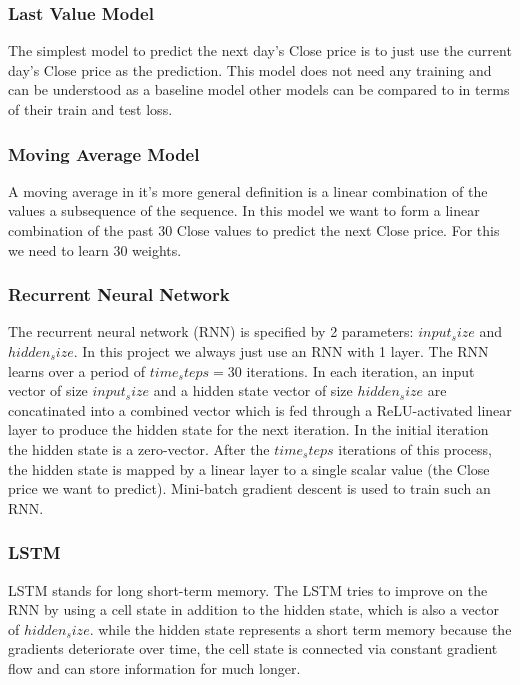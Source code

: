 \documentclass[utf8x]{ctexart}
\begin{document}
\subsubsection{Last Value Model}

The simplest model to predict the next day's Close price is to just use the current day's Close price as the prediction. This model does not need any training and can be understood as a baseline model other models can be compared to in terms of their train and test loss.

\subsubsection{Moving Average Model}

A moving average in it's more general definition is a linear combination of the values a subsequence of the sequence. In this model we want to form a linear combination of the past 30 Close values to predict the next Close price. For this we need to learn 30 weights.

\subsubsection{Recurrent Neural Network}

The recurrent neural network (RNN) is specified by 2 parameters: $input_size$ and $hidden_size$. In this project we always just use an RNN with 1 layer. The RNN learns over a period of $time_steps = 30$ iterations. In each iteration, an input vector of size $input_size$ and a hidden state vector of size $hidden_size$ are concatinated into a combined vector which is fed through a ReLU-activated linear layer to produce the hidden state for the next iteration. In the initial iteration the hidden state is a zero-vector. After the $time_steps$ iterations of this process, the hidden state is mapped by a linear layer to a single scalar value (the Close price we want to predict).
Mini-batch gradient descent is used to train such an RNN.

\subsubsection{LSTM}

LSTM stands for long short-term memory. The LSTM tries to improve on the RNN by using a cell state in addition to the hidden state, which is also a vector of $hidden_size$. while the hidden state represents a short term memory because the gradients deteriorate over time, the cell state is connected via constant gradient flow and can store information for much longer.
\end{document}
